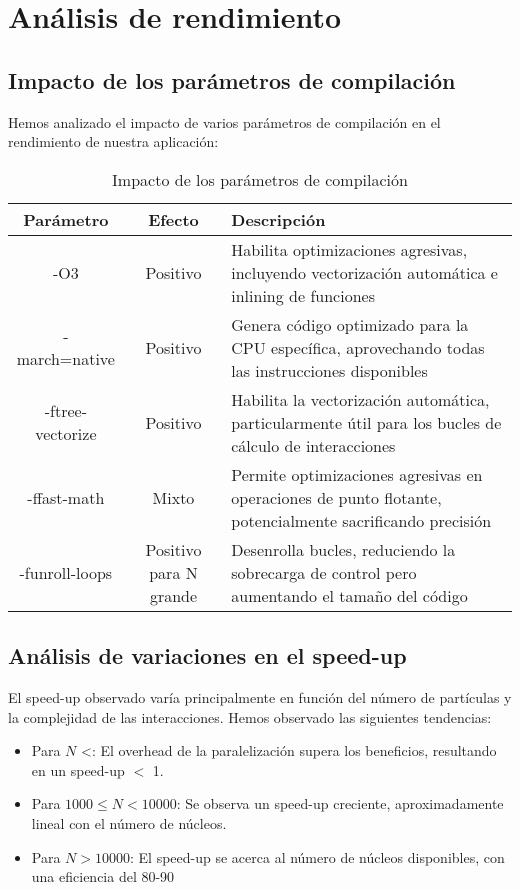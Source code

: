 \documentclass[12pt,a4paper]{article}
\begin{document}
	\newpage
	
	\section{Análisis de rendimiento}
	\subsection{Impacto de los parámetros de compilación}
	Hemos analizado el impacto de varios parámetros de compilación en el rendimiento de nuestra aplicación:
	
	\begin{table}[h]
		\centering
		\begin{tabular}{|c|c|p{8cm}|}
			\hline
			Parámetro & Efecto & Descripción \\
			\hline
			-O3 & Positivo & Habilita optimizaciones agresivas, incluyendo vectorización automática e inlining de funciones \\
			\hline
			-march=native & Positivo & Genera código optimizado para la CPU específica, aprovechando todas las instrucciones disponibles \\
			\hline
			-ftree-vectorize & Positivo & Habilita la vectorización automática, particularmente útil para los bucles de cálculo de interacciones \\
			\hline
			-ffast-math & Mixto & Permite optimizaciones agresivas en operaciones de punto flotante, potencialmente sacrificando precisión \\
			\hline
			-funroll-loops & Positivo para N grande & Desenrolla bucles, reduciendo la sobrecarga de control pero aumentando el tamaño del código \\
			\hline
		\end{tabular}
		\caption{Impacto de los parámetros de compilación}
		\label{tab:compilation_params}
	\end{table}
	

	
	\subsection{Análisis de variaciones en el speed-up}
	El speed-up observado varía principalmente en función del número de partículas y la complejidad de las interacciones. Hemos observado las siguientes tendencias:
	
	\begin{itemize}
		\item Para $N$ \textless {}: El overhead de la paralelización supera los beneficios, resultando en un speed-up $<$ 1.
		\item Para $1000 \leq  N < 10000$: Se observa un speed-up creciente, aproximadamente lineal con el número de núcleos.
		\item Para $N > 10000$: El speed-up se acerca al número de núcleos disponibles, con una eficiencia del 80-90%
	\end{itemize}
	
\end{document}
